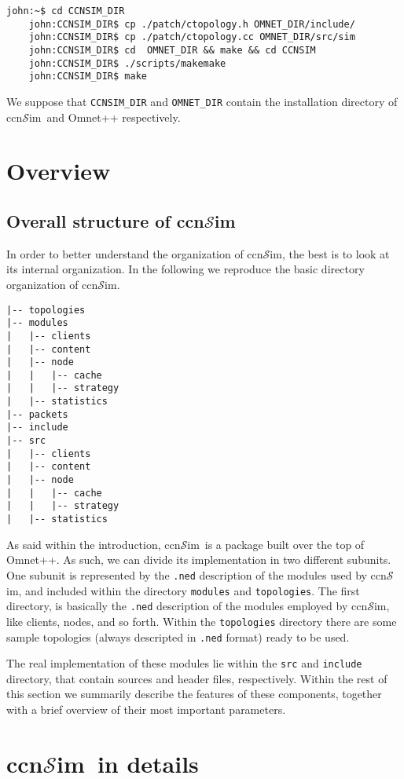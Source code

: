 \documentclass{article}
\newcommand{\ccnsim}{ccn$\mathcal{S}$im}
\begin{document}
\begin{Verbatim}[frame=single]
    john:~$ cd CCNSIM_DIR
    john:CCNSIM_DIR$ cp ./patch/ctopology.h OMNET_DIR/include/
    john:CCNSIM_DIR$ cp ./patch/ctopology.cc OMNET_DIR/src/sim
    john:CCNSIM_DIR$ cd  OMNET_DIR && make && cd CCNSIM
    john:CCNSIM_DIR$ ./scripts/makemake
    john:CCNSIM_DIR$ make
\end{Verbatim}
We suppose that \verb|CCNSIM_DIR| and \verb|OMNET_DIR| contain the installation directory of \ccnsim\ and Omnet++ respectively. 
\section{Overview}
\subsection{Overall structure of \ccnsim}
In order to better understand the organization of \ccnsim, the best is to look at its internal organization. In the following we reproduce the basic directory organization of \ccnsim. 
\begin{Verbatim}[frame=single]
|-- topologies
|-- modules
|   |-- clients
|   |-- content
|   |-- node
|   |   |-- cache
|   |   |-- strategy
|   |-- statistics
|-- packets
|-- include
|-- src
|   |-- clients
|   |-- content
|   |-- node
|   |   |-- cache
|   |   |-- strategy
|   |-- statistics
\end{Verbatim}
As said within the introduction, \ccnsim\ is a package built over the top of Omnet++. As such, we can divide its implementation in two different subunits. One subunit is represented by the \verb|.ned| description of the modules used by \ccnsim, and included within the directory \verb|modules| and \verb|topologies|. The first directory, is basically the \verb|.ned| description of the modules employed by \ccnsim, like clients, nodes, and so forth. Within the \verb|topologies| directory there are some sample topologies (always descripted in \verb|.ned| format) ready to be used. 

The real implementation of these modules lie within the \verb|src| and \verb|include| directory, that contain sources and header files, respectively.  Within the rest of this section we summarily  describe the features of these components, together with a brief overview of their most important parameters.

\section{\ccnsim\ in details}
\end{document}
